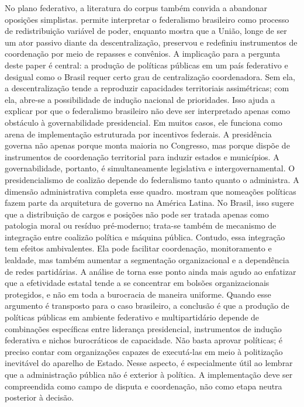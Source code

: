 \documentclass[12pt,a4paper]{article}
\begin{document}
No plano federativo, a literatura do corpus também convida a abandonar oposições simplistas. \textcite{falleti2005_a_sequential} permite interpretar o federalismo brasileiro como processo de redistribuição variável de poder, enquanto \textcite{oliveira2019_momentos_da} mostra que a União, longe de ser um ator passivo diante da descentralização, preservou e redefiniu instrumentos de coordenação por meio de repasses e convênios. A implicação para a pergunta deste paper é central: a produção de políticas públicas em um país federativo e desigual como o Brasil requer certo grau de centralização coordenadora. Sem ela, a descentralização tende a reproduzir capacidades territoriais assimétricas; com ela, abre-se a possibilidade de indução nacional de prioridades.
Isso ajuda a explicar por que o federalismo brasileiro não deve ser interpretado apenas como obstáculo à governabilidade presidencial. Em muitos casos, ele funciona como arena de implementação estruturada por incentivos federais. A presidência governa não apenas porque monta maioria no Congresso, mas porque dispõe de instrumentos de coordenação territorial para induzir estados e municípios. A governabilidade, portanto, é simultaneamente legislativa e intergovernamental. O presidencialismo de coalizão depende do federalismo tanto quanto o administra.
A dimensão administrativa completa esse quadro. \textcite{panizza2022_the_politics} mostram que nomeações políticas fazem parte da arquitetura de governo na América Latina. No Brasil, isso sugere que a distribuição de cargos e posições não pode ser tratada apenas como patologia moral ou resíduo pré-moderno; trata-se também de mecanismo de integração entre coalizão política e máquina pública. Contudo, essa integração tem efeitos ambivalentes. Ela pode facilitar coordenação, monitoramento e lealdade, mas também aumentar a segmentação organizacional e a dependência de redes partidárias. A análise de \textcite{mcdonnell2020_patchwork_leviathan} torna esse ponto ainda mais agudo ao enfatizar que a efetividade estatal tende a se concentrar em bolsões organizacionais protegidos, e não em toda a burocracia de maneira uniforme.
Quando esse argumento é transposto para o caso brasileiro, a conclusão é que a produção de políticas públicas em ambiente federativo e multipartidário depende de combinações específicas entre liderança presidencial, instrumentos de indução federativa e nichos burocráticos de capacidade. Não basta aprovar políticas; é preciso contar com organizações capazes de executá-las em meio à politização inevitável do aparelho de Estado. Nesse aspecto, \textcite{guy2022_bringing_political} é especialmente útil ao lembrar que a administração pública não é exterior à política. A implementação deve ser compreendida como campo de disputa e coordenação, não como etapa neutra posterior à decisão.
\end{document}
